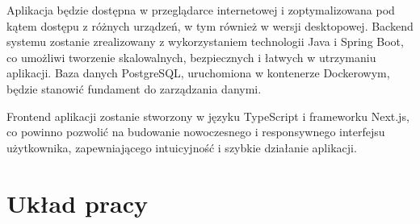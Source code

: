 Aplikacja będzie dostępna w przeglądarce internetowej i zoptymalizowana pod kątem dostępu z różnych urządzeń, w tym również w wersji desktopowej. Backend systemu zostanie zrealizowany z wykorzystaniem technologii Java i Spring Boot, co umożliwi tworzenie skalowalnych, bezpiecznych i łatwych w utrzymaniu aplikacji. Baza danych PostgreSQL, uruchomiona w kontenerze Dockerowym, będzie stanowić fundament do zarządzania danymi.

Frontend aplikacji zostanie stworzony w języku TypeScript i frameworku Next.js, co powinno pozwolić na budowanie nowoczesnego i responsywnego interfejsu użytkownika, zapewniającego intuicyjność i szybkie działanie aplikacji.

\section{Układ pracy}
